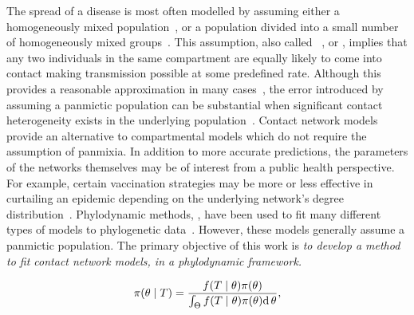 \label{sec:obj}

The spread of a disease is most often modelled by assuming either a
homogeneously mixed population~\autocite{hamer1906milroy,
kermack1927contribution}, or a population divided into a small number of
homogeneously mixed groups~\autocite{rushton1955deterministic}. This
assumption, also called ~\autocite{heesterbeek2000mathematical}, or , implies
that any two individuals in the same compartment are equally likely to come
into contact making transmission possible at some predefined rate. Although
this provides a reasonable approximation in many
cases~\autocite{anderson1992infectious}, the error introduced by assuming a
panmictic population can be substantial when significant contact heterogeneity
exists in the underlying
population~\autocite{bansal2007individual,barthelemy2005dynamical,keeling2005networks}.
Contact network models provide an alternative to compartmental models which do
not require the assumption of panmixia. In addition to more accurate
predictions, the parameters of the networks themselves may be of interest from
a public health perspective. For example, certain vaccination strategies may be
more or less effective in curtailing an epidemic depending on the underlying
network's degree distribution~\autocite{peng2013vaccination, ma2013importance}.
Phylodynamic methods, , have been used to fit many different types of models to phylogenetic
data~\autocite{pybus2009evolutionary,volz2013viral}. However, these models
generally assume a panmictic population. The primary objective of this work is
\emph{to develop a method to fit contact network models,  in a phylodynamic framework.}

\newcommand{\G}{\mathcal{G}}
\newcommand{\Nu}{\mathcal{N}}

\[
  \pi(\theta \mid T) = \frac{f(T \mid \theta) \pi(\theta)}
    {\int_\Theta f(T \mid \theta) \pi(\theta) \mathrm{d}\, \theta},
\]

